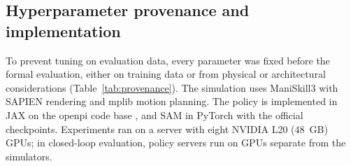 \subsection{Hyperparameter provenance and implementation}
\label{sec:provenance}
To prevent tuning on evaluation data, every parameter was fixed before the formal evaluation, either on training data or from physical or architectural considerations (Table~\ref{tab:provenance}). The simulation uses ManiSkill3 \citep{tao2025maniskill3} with SAPIEN rendering and mplib \citep{mplib} motion planning. The policy is implemented in JAX on the openpi code base \citep{black2024pi0}, and SAM in PyTorch with the official checkpoints. Experiments ran on a server with eight NVIDIA L20 (48~GB) GPUs; in closed-loop evaluation, policy servers run on GPUs separate from the simulators.
